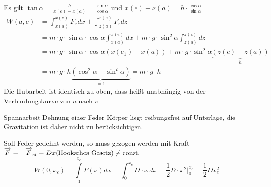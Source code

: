 \documentclass[a4paper,10pt]{scrartcl}
\begin{document}
Es gilt $\tan\alpha=\frac{h}{x(e)-x(a)}=\frac{\sin\alpha}{\cos\alpha}$ und $x(e)-x(a)=h\cdot \frac{\cos\alpha}{\sin\alpha}$
\begin{align*}
 W(a,e)&=\int_{x(a)}^{x(e)} F_x dx+\int_{z(a)}^{z(e)} F_z dz\\
 &= m \cdot g \cdot \sin \alpha \cdot \cos \alpha \int_{x(a)}^{x(e)} dx+ m\cdot g\cdot \sin^2 \alpha \int_{z(a)}^{z(e)} dz\\
 &= m\cdot g\cdot \sin \alpha\cdot \cos\alpha (x(e_1)-x(a))+m\cdot g \cdot \sin^2{\alpha} \underbrace{(z(e)-z(a))}_h\\
 &=m\cdot g\cdot h\underbrace{(\cos^2\alpha +\sin^2\alpha)}_{=1}=m\cdot g\cdot h 
\end{align*}
Die Hubarbeit ist identisch zu oben, dass heißt unabhängig von der Verbindungskurve von $a$ nach $e$
\begin{seg}{Spannarbeit}
Dehnung einer Feder Körper liegt reibungsfrei auf Unterlage, die Gravitation ist daher nicht zu berücksichtigen.
 
Soll Feder gedehnt werden, so muss gezogen werden mit Kraft $\overrightarrow{F}=-\overrightarrow{F}_{el}=Dx (\text{Hooksches Gesetz})\neq \text{const}.$
\[
 W(0,x_e)=\int\limits_0^{x_e} F(x) dx=\int_0^{x_e} D\cdot x\,dx=\frac{1}{2} D \cdot x^2 |_0^{x_e}= \frac 1 2 D x_e^2
\]
\end{seg}
% 
\end{document}
